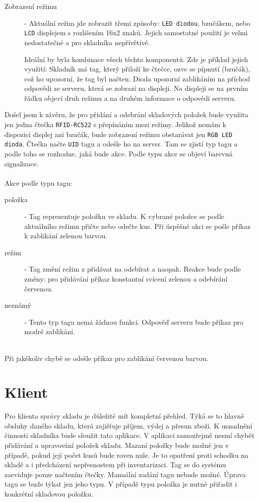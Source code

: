 \documentclass[czech,BP]{thesiskiv}
\begin{document}
\begin{itemize}
\begin{description}
				\item [Zobrazení režimu] - Aktuální režim jde zobrazit třemi způsoby: \texttt{LED diodou}, bzučákem, nebo \texttt{LCD} displejem s rozlišením 16x2 znaků. Jejich samostatné použití je velmi nedostatečné a pro skladníka nepřívětivé. 


				Ideální by byla kombinace všech těchto komponentů. Zde je příklad jejich využití: Skladník má tag, který přiloží ke čtečce, ozve se pípnutí (bzučák), což ho upozorní, že tag byl načten. Dioda upozorní zablikáním na příchod odpovědi ze serveru, která se zobrazí na displeji. Na displeji se na prvním řádku objeví druh režimu a na druhém informace o odpovědi serveru.
				
				\end{description}				
				
				\end{itemize}
							
\newpage
\noindent					
				Došel jsem k závěru, že pro přidání a odebrání skladových položek bude využita jen jedna čtečka \texttt{RFID-RC522} s přepínáním mezi režimy.
				Jelikož nemám k dispozici displej ani bzučák, bude zobrazení režimu obstarávat jen \texttt{RGB LED dioda}. Čtečka načte \texttt{UID} tagu a odešle ho na server. Tam se zjistí typ tagu a podle toho se rozhodne, jaká bude akce. Podle typu akce se objeví barevná signalizace. 
				\\\\
				Akce podle typu tagu:
				\begin{description}
					\item [položka] - Tag reprezentuje položku ve skladu. K vybrané položce se podle aktuálního režimu přičte nebo odečte kus. Při úspěšné akci se pošle příkaz k zablikání zelenou barvou.
									
					\item [režim] - Tag změní režim z přidávat na odebírat a naopak. Reakce bude podle změny: pro přidávání příkaz konstantní svícení zelenou a odebírání červenou.
					\item [neznámý] - Tento typ tagu nemá žádnou funkci. Odpověď serveru bude příkaz pro modré zablikání.
				\end{description}
				\ \\
				Při jakékoliv chybě se odešle příkaz pro zablikání červenou barvou.

				
	\section{Klient}
		Pro klienta správy skladu je důležité mít kompletní přehled. Týká se to hlavně obsluhy daného skladu, která zajišťuje příjem, výdej a přesun zboží.
		K usnadnění činnosti skladníka bude sloužit tato aplikace. V aplikaci samozřejmě nesmí chybět přidávání a upravování položek skladu.
		Mazaní položky bude možné jen v případě, pokud její počet kusů bude roven nule. Je to opatření proti schodku na skladě a i předcházení nepřesnostem při inventarizaci.
		Tag se do systému zaeviduje pouze načtením čtečky. Manuální zadání tagu nebude možné. Úprava tagu se bude týkat jen jeho typu. V případě typu položka je nutné přiřadit i konkrétní skladovou položku.
		
\end{document}
